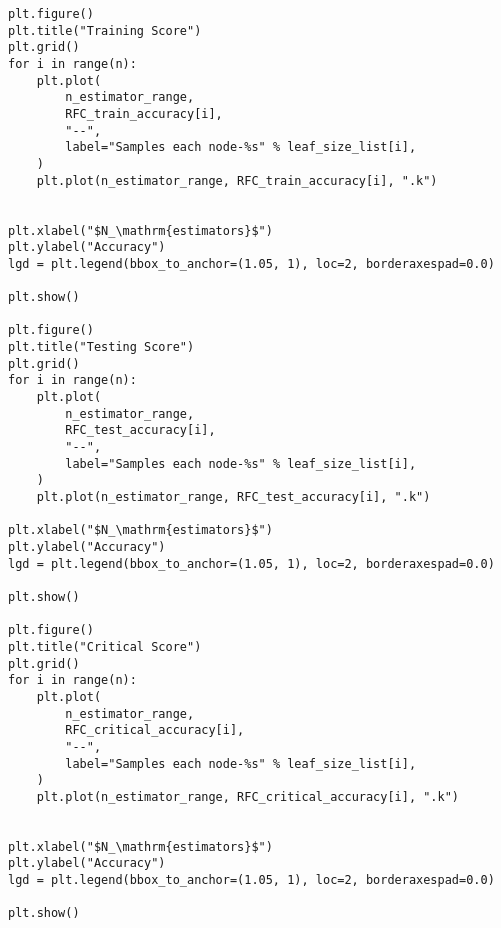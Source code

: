 \begin{verbatim}
plt.figure()
plt.title("Training Score")
plt.grid()
for i in range(n):
    plt.plot(
        n_estimator_range,
        RFC_train_accuracy[i],
        "--",
        label="Samples each node-%s" % leaf_size_list[i],
    )
    plt.plot(n_estimator_range, RFC_train_accuracy[i], ".k")


plt.xlabel("$N_\mathrm{estimators}$")
plt.ylabel("Accuracy")
lgd = plt.legend(bbox_to_anchor=(1.05, 1), loc=2, borderaxespad=0.0)

plt.show()

plt.figure()
plt.title("Testing Score")
plt.grid()
for i in range(n):
    plt.plot(
        n_estimator_range,
        RFC_test_accuracy[i],
        "--",
        label="Samples each node-%s" % leaf_size_list[i],
    )
    plt.plot(n_estimator_range, RFC_test_accuracy[i], ".k")

plt.xlabel("$N_\mathrm{estimators}$")
plt.ylabel("Accuracy")
lgd = plt.legend(bbox_to_anchor=(1.05, 1), loc=2, borderaxespad=0.0)

plt.show()

plt.figure()
plt.title("Critical Score")
plt.grid()
for i in range(n):
    plt.plot(
        n_estimator_range,
        RFC_critical_accuracy[i],
        "--",
        label="Samples each node-%s" % leaf_size_list[i],
    )
    plt.plot(n_estimator_range, RFC_critical_accuracy[i], ".k")


plt.xlabel("$N_\mathrm{estimators}$")
plt.ylabel("Accuracy")
lgd = plt.legend(bbox_to_anchor=(1.05, 1), loc=2, borderaxespad=0.0)

plt.show()

\end{verbatim}

\twocolumn
